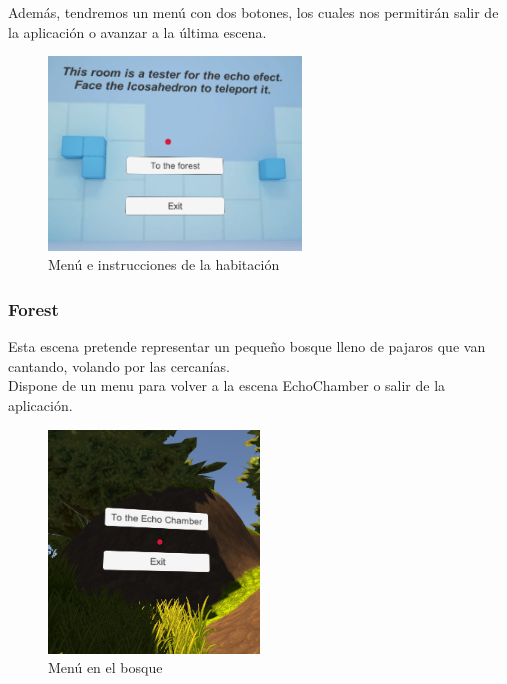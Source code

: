 \quad Además, tendremos un menú con dos botones, los cuales nos permitirán salir de la aplicación o avanzar a la última escena.\\

\begin{figure}[htb]
	\centering
	\includegraphics[width=0.6\textwidth]{./imagenes/echoMenu}
	\caption{Menú e instrucciones de la habitación}
\end{figure} 
	
	\subsubsection{Forest}

\quad Esta escena pretende representar un pequeño bosque lleno de pajaros que van cantando, volando por las cercanías.\\

\quad Dispone de un menu para volver a la escena EchoChamber o salir de la aplicación.\\

\begin{figure}[htb]
	\centering
	\includegraphics[width=0.5\textwidth]{./imagenes/forestMenu}
	\caption{Menú en el bosque}
\end{figure}

